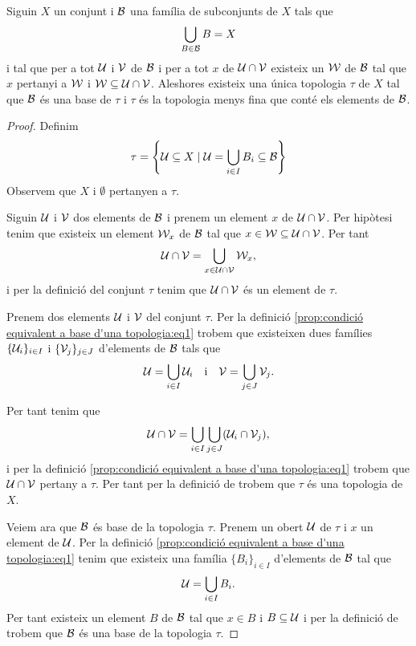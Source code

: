 \documentclass[../Apunts.tex]{subfiles}
\begin{document}
	\begin{proposition}
		\label{prop:condició equivalent a base d'una topologia}
		\label{prop:condició per que una topologia sigui la més fina que conté una base}
		Siguin \(X\) un conjunt i \(\mathcal{B}\) una família de subconjunts de \(X\) tals que
		\[\bigcup_{B\in\mathcal{B}}B=X\]
		i tal que per a tot \(\mathcal{U}\) i \(\mathcal{V}\) de \(\mathcal{B}\) i per a tot \(x\) de \(\mathcal{U}\cap\mathcal{V}\) existeix un \(\mathcal{W}\) de \(\mathcal{B}\) tal que \(x\) pertanyi a \(\mathcal{W}\) i \(\mathcal{W}\subseteq\mathcal{U}\cap\mathcal{V}\).	Aleshores existeix una única topologia \(\tau\) de \(X\) tal que \(\mathcal{B}\) és una base de \(\tau\) i \(\tau\) és la topologia menys fina que conté els elements de \(\mathcal{B}\).
		\begin{proof}
			Definim
			\begin{equation}
				\label{prop:condició equivalent a base d'una topologia:eq1}
				\tau=\left\{\obert{U}\subseteq X\mid\obert{U}=\bigcup_{i\in I}B_{i}\subseteq\base{B}\right\}
			\end{equation}
			Observem que \(X\) i \(\emptyset\) pertanyen a \(\tau\).
			
			Siguin \(\mathcal{U}\) i \(\mathcal{V}\) dos elements de \(\mathcal{B}\) i prenem un element \(x\) de \(\mathcal{U}\cap\mathcal{V}\). Per hipòtesi tenim que existeix un element  \(\mathcal{W}_{x}\) de \(\mathcal{B}\) tal que \(x\in\mathcal{W}\subseteq\mathcal{U}\cap\mathcal{V}\). Per tant
			\[\mathcal{U}\cap\mathcal{V}=\bigcup_{x\in\mathcal{U}\cap\mathcal{V}}\mathcal{W}_{x},\]
			i per la definició del conjunt \(\tau\) tenim que \(\mathcal{U}\cap\mathcal{V}\) és un element de \(\tau\).
			
			Prenem dos elements \(\mathcal{U}\) i \(\mathcal{V}\) del conjunt \(\tau\). Per la definició \eqref{prop:condició equivalent a base d'una topologia:eq1} trobem que existeixen dues famílies \(\{\mathcal{U}_{i}\}_{i\in I}\) i \(\{\mathcal{V}_{j}\}_{j\in J}\) d'elements de \(\mathcal{B}\) tals que
			\[\mathcal{U}=\bigcup_{i\in I}\mathcal{U}_{i}\quad\text{i}\quad\mathcal{V}=\bigcup_{j\in J}\mathcal{V}_{j}.\]
			
			Per tant tenim que
			\[\mathcal{U}\cap\mathcal{V}=\bigcup_{i\in I}\bigcup_{j\in J}(\mathcal{U}_{i}\cap\mathcal{V}_{j}),\]
			i per la definició \eqref{prop:condició equivalent a base d'una topologia:eq1} trobem que \(\mathcal{U}\cap\mathcal{V}\) pertany a \(\tau\). Per tant per la definició de  trobem que \(\tau\) és una topologia de \(X\).
			
			Veiem ara que \(\mathcal{B}\) és base de la topologia \(\tau\). Prenem un obert \(\mathcal{U}\) de \(\tau\) i \(x\) un element de \(\mathcal{U}\). Per la definició \eqref{prop:condició equivalent a base d'una topologia:eq1} tenim que existeix una família \(\{B_{i}\}_{i\in I}\) d'elements de \(\mathcal{B}\) tal que
			\[\mathcal{U}=\bigcup_{i\in I}B_{i}.\]
			Per tant existeix un element \(B\) de \(\mathcal{B}\) tal que \(x\in B\) i \(B\subseteq\mathcal{U}\) i per la definició de  trobem que \(\mathcal{B}\) és una base de la topologia \(\tau\).
			

\end{proof}
\end{proposition}
\end{document}
